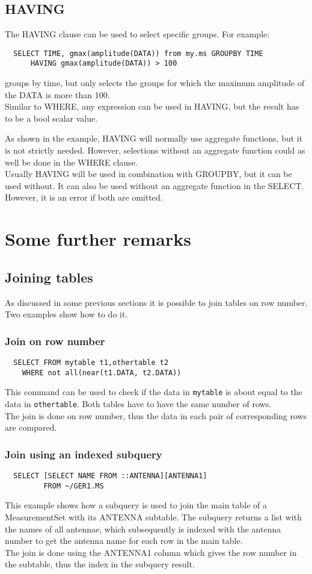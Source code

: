\subsection{HAVING}
The HAVING clause can be used to select specific groups. For example:
\begin{verbatim}
  SELECT TIME, gmax(amplitude(DATA)) from my.ms GROUPBY TIME
      HAVING gmax(amplitude(DATA)) > 100
\end{verbatim}
groups by time, but only selects the groups for which the maximum
amplitude of the DATA is more than 100.
\\Similar to WHERE, any expression can be used in HAVING, but the
result has to be a bool scalar value.

As shown in the example, HAVING
will normally use aggregate functions, but it is not strictly
needed. However, selections without an aggregate function could
as well be done in the WHERE clause.
\\Usually HAVING will be used in combination with GROUPBY, but it can
be used without. It can also be used without an aggregate function in
the SELECT. However, it is an error if both are omitted.


\section{Some further remarks}
\subsection{\label{TAQL:JOIN}Joining tables}
As discussed in some previous sections it is possible to join tables
on row number. Two examples show how to do it.

\subsubsection{Join on row number}
\begin{verbatim}
  SELECT FROM mytable t1,othertable t2
    WHERE not all(near(t1.DATA, t2.DATA))
\end{verbatim}
This command can be used to check if the data in \texttt{mytable} is about
equal to the data in \texttt{othertable}. Both tables have to have the
same number of rows.
\\The join is done on row number, thus the data in each pair of
corresponding rows are compared.

\subsubsection{Join using an indexed subquery}
\begin{verbatim}
  SELECT [SELECT NAME FROM ::ANTENNA][ANTENNA1]
         FROM ~/GER1.MS 
\end{verbatim}
This example shows how a subquery is used to join the main table of a
MeasurementSet with its ANTENNA subtable. The subquery returns a list
with the names of all antennae, which subsequently is indexed with the
antenna number to get the antenna name for each row in the main table.
\\The join is done using the ANTENNA1 column which gives the row
number in the subtable, thus the index in the subquery result.

